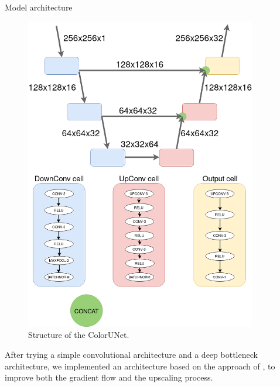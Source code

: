 \documentclass[final]{beamer}
\newlength{\sepwid}
\newlength{\onecolwid}
\newlength{\twocolwid}
\begin{document}
\begin{frame}[t]
\begin{columns}[t]
\begin{column}{\twocolwid}
\begin{columns}[t,totalwidth=\twocolwid]
\begin{column}{\onecolwid}

\end{column} %


\end{columns} %

\end{column} %

\begin{column}{\sepwid}\end{column} %

\begin{column}{\onecolwid} %


\begin{block}{Model architecture}

  \begin{figure}
  \begin{center}
  \includegraphics[width=.5\linewidth]{diagram}
  \caption{Structure of the ColorUNet.}
  \label{structure}
  \end{center}
  \end{figure}

After trying a simple convolutional architecture and a deep bottleneck architecture, we implemented an architecture based on the approach of \cite{ronneberger2015unet}, to improve both the gradient flow and the upscaling process.


\end{block}
\end{column}
\end{columns}
\end{frame}
\end{document}
